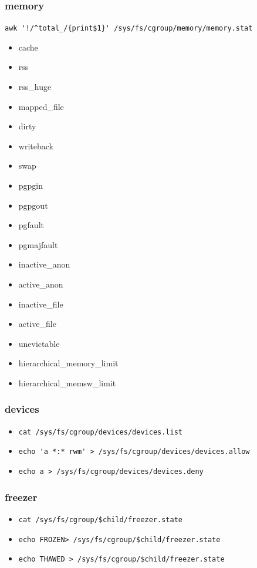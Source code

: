 \documentclass{beamer}
\begin{document}
\begin{frame}[fragile]
    \frametitle{memory}
    \verb|awk '!/^total_/{print$1}' /sys/fs/cgroup/memory/memory.stat|
    \begin{multicols}{2}
        \begin{itemize}
            \item cache
            \item rss
            \item rss\_huge
            \item mapped\_file
            \item dirty
            \item writeback
            \item swap
            \item pgpgin
            \item pgpgout
            \item pgfault
            \item pgmajfault
            \item inactive\_anon
            \item active\_anon
            \item inactive\_file
            \item active\_file
            \item unevictable
            \item hierarchical\_memory\_limit
            \item hierarchical\_memsw\_limit
        \end{itemize}
    \end{multicols}
\end{frame}

\begin{frame}[fragile]
    \frametitle{devices}
    \begin{itemize}
        \item \verb|cat /sys/fs/cgroup/devices/devices.list|
        \item \verb|echo 'a *:* rwm' > /sys/fs/cgroup/devices/devices.allow|
        \item \verb|echo a > /sys/fs/cgroup/devices/devices.deny|
    \end{itemize}
\end{frame}

\begin{frame}[fragile]
    \frametitle{freezer}
    \begin{itemize}
        \item \verb|cat /sys/fs/cgroup/$child/freezer.state|
        \item \verb|echo FROZEN> /sys/fs/cgroup/$child/freezer.state|
        \item \verb|echo THAWED > /sys/fs/cgroup/$child/freezer.state|
    \end{itemize}
\end{frame}
\end{document}
